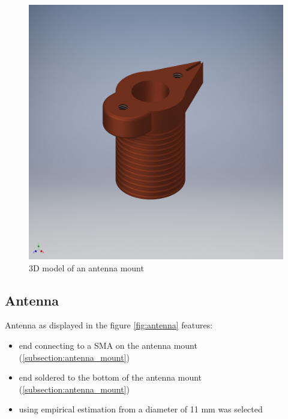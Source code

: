 \begin{figure}[h]
	\centering
	\includegraphics[width=\textwidth]{images/antenna_mount}
	\caption{3D model of an antenna mount}
	\label{fig:antenna_mount}
\end{figure}

\clearpage
\subsection{Antenna}
\label{subsection:antenna}
Antenna as displayed in the figure \ref{fig:antenna} features:
\begin{itemize}
	\item end connecting to a SMA on the antenna mount (\ref{subsection:antenna_mount})
	\item end soldered to the bottom of the antenna mount (\ref{subsection:antenna_mount})
	\item using empirical estimation from \cite{Siverns2012} a diameter of 11 mm was selected
\end{itemize}

